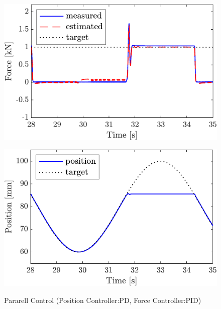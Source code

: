 \begin{figure}[t]
    \begin{minipage}{\minipageratio\hsize}
    \centering
        \includegraphics[keepaspectratio, scale = \minifigscale]{contents/IntegrationControl/figure/SECASQ/crop-FBsw_PID_force.pdf}
        \label{fig5:crop-FBsw_PID_force}
    \end{minipage}
    \begin{minipage}{\minipageratio\hsize}
    \centering
        \includegraphics[keepaspectratio, scale = \minifigscale]
        {contents/IntegrationControl/figure/SECASQ/crop-FBsw_PID_pos.pdf}
        \label{fig5:crop-FBsw_PID_pos}
    \end{minipage}
    \caption{Pararell Control (Position Controller:PD, Force Controller:PID)}   
    \label{fig5:crop-FBsw_PID}
\end{figure}

